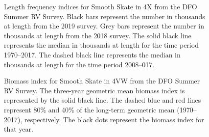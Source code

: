 \documentclass[11pt]{book}
\begin{document}
\begin{figure}[htb]

{\centering {} 

}

\caption{Length frequency indices for Smooth Skate in 4X from the DFO Summer RV Survey. Black bars represent the number in thousands at length from the 2019 survey. Grey bars represent the number in thousands at length from the 2018 survey. The solid black line represents the median in thousands at length for the time period 1970--2017. The dashed black line represents the median in thousands at length for the time period 2008--017.}\label{fig:102-fig-smoothskate-lengthfreq4X}
\end{figure}

\begin{figure}[htb]

{\centering {} 

}

\caption{Biomass index for Smooth Skate in 4VW from the DFO Summer RV Survey. The three-year geometric mean biomass index is represented by the solid black line. The dashed blue and red lines represent 80\% and 40\% of the long-term geometric mean (1970--2017), respectively. The black dots represent the biomass index for that year.}\label{fig:103-fig-smoothskate-biomass4VW}
\end{figure}
\end{document}
